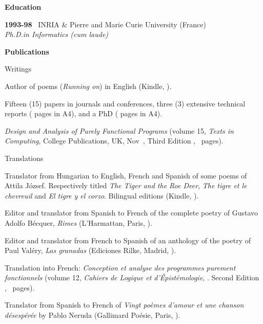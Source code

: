 \documentclass[a4paper,11pt]{article}
\begin{document}
\bigskip
\bigskip
\noindent\textbf{\large Education}
\bigskip

\noindent\textbf{1993-98} \ \textsf{INRIA \& Pierre and Marie Curie
  University} (France)\\ \emph{Ph.D.\@ in Informatics (cum
laude)}

\newpage

\noindent\textbf{\large Publications}

\bigskip

\noindent Writings
\begin{itemize*}

  \item Author of poems (\textit{Running on}) in English (Kindle,
    ).

  \item Fifteen (15) papers in journals and conferences, three (3)
    extensive technical reports ( pages in A4), and
    a PhD ( pages in A4).

  \item \textit{Design and Analysis of Purely Functional Programs}
    (volume 15, \emph{Texts in Computing}, College Publications, UK,
    Nov~, Third Edition ,
    ~pages).

\end{itemize*}

\noindent Translations

\begin{itemize*}

  \item Translator from Hungarian to English, French and Spanish of
    some poems of Attila József. Respectively titled \emph{The Tiger
    and the Roe Deer}, \emph{The tigre et le chevreuil} and \emph{El
    tigre y el corzo}. Bilingual editions (Kindle,
    ).

  \item Editor and translator from Spanish to French of the complete
    poetry of Gustavo Adolfo Bécquer, \textit{Rimes} (L'Harmattan,
    Paris, ).

  \item Editor and translator from French to Spanish of an anthology
    of the poetry of Paul Valéry, \emph{Las granadas} (Ediciones
    Rilke, Madrid, ).

  \item Translation into French: \textit{Conception et analyse des
    programmes purement fonctionnels} (volume 12, \emph{Cahiers de
  Logique et d'Épistémologie}, . Second Edition
    , ~pages).

  \item Translator from Spanish to French of \textit{Vingt poèmes
    d'amour et une chanson désespérée} by Pablo Neruda (Gallimard
    Poésie, Paris, ).

\end{itemize*}
\end{document}
